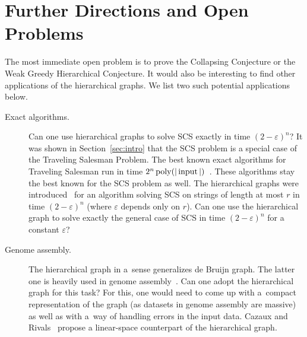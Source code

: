 \section{Further Directions and Open Problems}
The most immediate open problem is to prove the Collapsing Conjecture or the Weak Greedy Hierarchical Conjecture.
It would also be interesting to find other applications of the 
hierarchical graphs. We list two such potential applications below.
\begin{description}
\item[Exact algorithms.] Can one use hierarchical graphs to solve SCS exactly in time $(2-\varepsilon)^n$?
It was shown in Section~\ref{sec:intro} that the SCS problem is a special case of the Traveling Salesman Problem. The best known exact algorithms for Traveling Salesman run in time $2^n \operatorname{poly}(|\operatorname{input}|)$~\cite{B1962, HK1971, KGK1977, K1982, BF1996}. These algorithms stay the best known for the SCS problem as well. The hierarchical graphs were introduced~\cite{scs_exact} for an algorithm solving SCS on strings of length at most $r$ in time $(2-\varepsilon)^n$ (where $\varepsilon$ depends only on $r$). Can one use the hierarchical graph to solve exactly the general case of SCS in time $(2-\varepsilon)^n$ for a constant $\varepsilon$?

\item[Genome assembly.] The hierarchical graph in a~sense
generalizes de Bruijn graph. The latter one is heavily used
in genome assembly~\cite{pevzner2001eulerian}.
Can one adopt the hierarchical graph for this task? For this, one
would need to come up with a~compact representation of the graph
(as datasets in genome assembly are massive) as well as with a~way of
handling errors in the input data. Cazaux and Rivals~\cite{cazaux2018hierarchical} propose a linear-space counterpart of the hierarchical graph.
\end{description}
